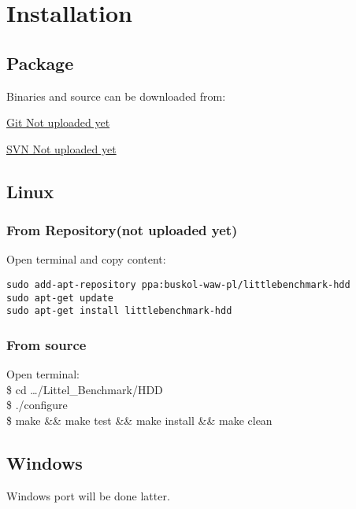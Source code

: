 \hypertarget{Installation}{
\section{Installation}
\label{Installation}
}

\subsection{Package}
Binaries and source can be downloaded from:
\begin{description}
\item \href{http://github.com/str0g/LittleBenchmark/tree/master/HDD/Release}{Git Not uploaded yet}
\item \href{https://subversion.assembla.com/svn/littlebenchmark-hdd/}{SVN Not uploaded yet}
\end{description}

\subsection{Linux}

\subsubsection{From Repository(not uploaded yet)}
Open terminal and copy content:
\begin{verbatim}
sudo add-apt-repository ppa:buskol-waw-pl/littlebenchmark-hdd
sudo apt-get update
sudo apt-get install littlebenchmark-hdd
\end{verbatim}

\subsubsection{From source}
Open terminal:\\
\$ cd \ldots/Littel\_Benchmark/HDD\\
\$ ./configure\\
\$ make \&\& make test \&\& make install \&\& make clean\\
\subsection{Windows}
Windows port will be done latter.


